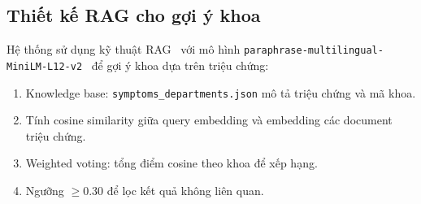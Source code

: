 \documentclass[a4paper,13pt,3p,twoside,openany]{report}
\theoremstyle{definition}
\theoremstyle{remark}
\theoremstyle{definition}
\let\ORIGsubsection\subsection
\renewcommand{\subsection}{\needspace{3\baselineskip}\ORIGsubsection}
\begin{document}
\subsection{Thiết kế RAG cho gợi ý khoa}

Hệ thống sử dụng kỹ thuật RAG~\cite{rag} với mô hình \texttt{paraphrase-multilingual-MiniLM-L12-v2}~\cite{sbert} để gợi ý khoa dựa trên triệu chứng:
\begin{enumerate}
  \item Knowledge base: \texttt{symptoms\_departments.json} mô tả triệu chứng và mã khoa.
  \item Tính cosine similarity giữa query embedding và embedding các document triệu chứng.
  \item Weighted voting: tổng điểm cosine theo khoa để xếp hạng.
  \item Ngưỡng $\geq 0.30$ để lọc kết quả không liên quan.
\end{enumerate}
\end{document}
